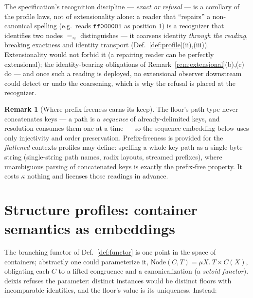 \documentclass[11pt]{article}
\theoremstyle{definition}
\newtheorem{remark}[theorem]{Remark}
\newcommand{\eqS}{=_{\approx}}                     %
\begin{document}
The specification's recognition discipline --- \emph{exact or refusal} --- is a
corollary of the profile laws, not of extensionality alone: a reader that
``repairs'' a non-canonical spelling (e.g.\ reads $\mathtt{ff000001}$ as position
$1$) is a recognizer that identifies two nodes $\eqS$ distinguishes --- it coarsens
identity \emph{through the reading}, breaking exactness and identity transport
(Def.~\ref{def:profile}(ii),(iii)). Extensionality would not forbid it (a repairing
reader can be perfectly extensional); the identity-bearing obligations of
Remark~\ref{rem:extensional}(b),(c) do --- and once such a reading is deployed, no
extensional observer downstream could detect or undo the coarsening, which is why the
refusal is placed at the recognizer.

\begin{remark}[Where prefix-freeness earns its keep]\label{rem:prefixfree}
The floor's path type never concatenates keys --- a path is a \emph{sequence} of
already-delimited keys, and resolution consumes them one at a time --- so the
sequence embedding below uses only injectivity and order preservation. Prefix-freeness
is provided for the \emph{flattened} contexts profiles may define: spelling a whole
key path as a single byte string (single-string path names, radix layouts, streamed
prefixes), where unambiguous parsing of concatenated keys is exactly the prefix-free
property. It costs $\kappa$ nothing and licenses those readings in advance.
\end{remark}

\section{Structure profiles: container semantics as embeddings}\label{sec:profiles}

The branching functor of Def.~\ref{def:functor} is one point in the space of
containers; abstractly one could parameterize it,
$\mathrm{Node}(C, T) = \mu X.\ T \times C(X)$, obligating each $C$ to a lifted
congruence and a canonicalization (a \emph{setoid functor}). deixis refuses the
parameter: distinct instances would be distinct floors with incomparable identities,
and the floor's value is its uniqueness. Instead:
\end{document}
